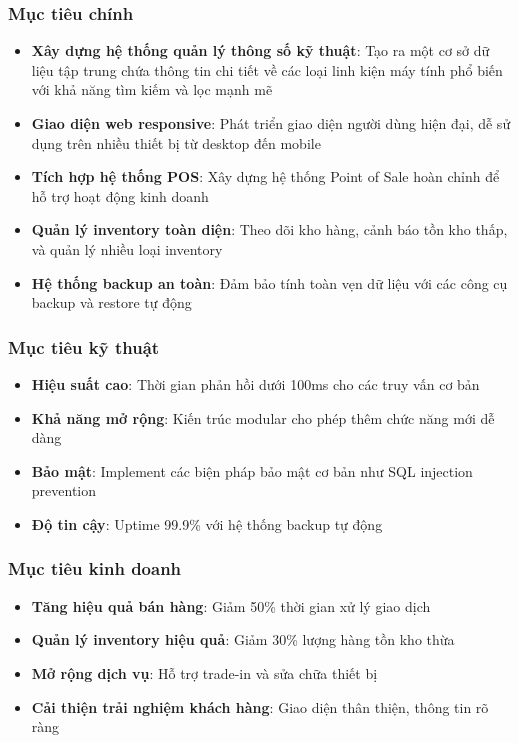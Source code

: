\documentclass[12pt,a4paper]{article}
\begin{document}
\subsubsection{Mục tiêu chính}
\begin{itemize}
    \item \textbf{Xây dựng hệ thống quản lý thông số kỹ thuật}: Tạo ra một cơ sở dữ liệu tập trung chứa thông tin chi tiết về các loại linh kiện máy tính phổ biến với khả năng tìm kiếm và lọc mạnh mẽ
    \item \textbf{Giao diện web responsive}: Phát triển giao diện người dùng hiện đại, dễ sử dụng trên nhiều thiết bị từ desktop đến mobile
    \item \textbf{Tích hợp hệ thống POS}: Xây dựng hệ thống Point of Sale hoàn chỉnh để hỗ trợ hoạt động kinh doanh
    \item \textbf{Quản lý inventory toàn diện}: Theo dõi kho hàng, cảnh báo tồn kho thấp, và quản lý nhiều loại inventory
    \item \textbf{Hệ thống backup an toàn}: Đảm bảo tính toàn vẹn dữ liệu với các công cụ backup và restore tự động
\end{itemize}

\subsubsection{Mục tiêu kỹ thuật}
\begin{itemize}
    \item \textbf{Hiệu suất cao}: Thời gian phản hồi dưới 100ms cho các truy vấn cơ bản
    \item \textbf{Khả năng mở rộng}: Kiến trúc modular cho phép thêm chức năng mới dễ dàng
    \item \textbf{Bảo mật}: Implement các biện pháp bảo mật cơ bản như SQL injection prevention
    \item \textbf{Độ tin cậy}: Uptime 99.9\% với hệ thống backup tự động
\end{itemize}

\subsubsection{Mục tiêu kinh doanh}
\begin{itemize}
    \item \textbf{Tăng hiệu quả bán hàng}: Giảm 50\% thời gian xử lý giao dịch
    \item \textbf{Quản lý inventory hiệu quả}: Giảm 30\% lượng hàng tồn kho thừa
    \item \textbf{Mở rộng dịch vụ}: Hỗ trợ trade-in và sửa chữa thiết bị
    \item \textbf{Cải thiện trải nghiệm khách hàng}: Giao diện thân thiện, thông tin rõ ràng
\end{itemize}
\end{document}
